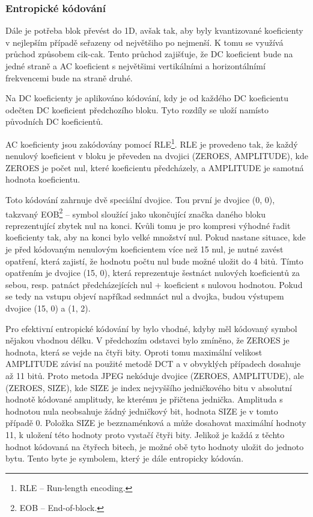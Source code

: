 \subsubsection*{Entropické kódování}

Dále je potřeba blok převést do 1D, avšak tak, aby byly kvantizované koeficienty v nejlepším případě seřazeny od největšiho po nejmenší.
K tomu se využívá průchod způsobem cik-cak.
Tento průchod zajišťuje, že DC koeficient bude na jedné straně a AC koeficient s největšimi vertikálními a horizontálnímí frekvencemi bude na straně druhé.

Na DC koeficienty je aplikováno kódování, kdy je od každého DC koeficientu odečten DC koeficient předchozího bloku.
Tyto rozdíly se uloží namísto původních DC koeficientů.

AC koeficienty jsou zakódovány pomocí RLE\footnote{RLE -- Run-length encoding.}.
RLE je provedeno tak, že každý nenulový koeficient v bloku je převeden na dvojici (ZEROES, AMPLITUDE), kde ZEROES je počet nul, které koeficientu předcházely, a AMPLITUDE je samotná hodnota koeficientu.

Toto kódování zahrnuje dvě speciální dvojice.
Tou první je dvojice (0, 0), takzvaný EOB\footnote{EOB -- End-of-block.} -- symbol sloužící jako ukončující značka daného bloku reprezentující zbytek nul na konci.
Kvůli tomu je pro kompresi výhodné řadit koeficienty tak, aby na konci bylo velké množství nul.
Pokud nastane situace, kde je před kódovaným nenulovým koeficientem více než 15 nul, je nutné zavést opatření, která zajistí, že hodnotu počtu nul bude možné uložit do 4 bitů.
Tímto opatřením je dvojice (15, 0), která reprezentuje šestnáct nulových koeficientů za sebou, resp. patnáct předcházejících nul + koeficient s nulovou hodnotou.
Pokud se tedy na vstupu objeví napříkad sedmnáct nul a dvojka, budou výstupem dvojice (15, 0) a (1, 2).

Pro efektivní entropické kódování by bylo vhodné, kdyby měl kódovaný symbol nějakou vhodnou délku.
V předchozím odstavci bylo zmíněno, že ZEROES je hodnota, která se vejde na čtyři bity.
Oproti tomu maximální velikost AMPLITUDE závisí na použité metodě DCT a v obvyklých případech dosahuje až 11 bitů.
Proto metoda JPEG nekóduje dvojice (ZEROES, AMPLITUDE), ale (ZEROES, SIZE), kde SIZE je index nejvyššího jedničkového bitu v absolutní hodnotě kódované amplitudy, ke kterému je přičtena jednička.
Amplituda s hodnotou nula neobsahuje žádný jedničkový bit, hodnota SIZE je v tomto případě 0.
Položka SIZE je bezznaménková a může dosahovat maximální hodnoty 11, k uložení této hodnoty proto vystačí čtyři bity.
Jelikož je každá z těchto hodnot kódovaná na čtyřech bitech, je možné obě tyto hodnoty uložit do jednoto bytu.
Tento byte je symbolem, který je dále entropicky kódován.

